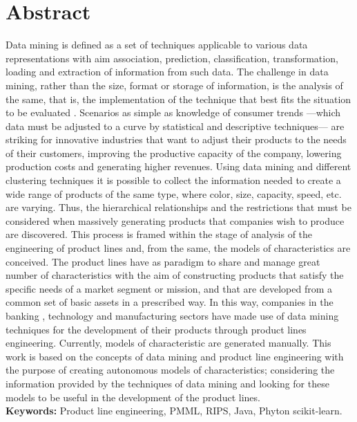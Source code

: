 \chapter{Abstract}

Data mining is defined as a set of techniques applicable to various data representations with aim association, prediction, classification, transformation, loading and extraction of information from such data. The challenge in data mining, rather than the size, format or storage of information, is the analysis of the same, that is, the implementation of the technique that best fits the situation to be evaluated \cite{Izenman2006}. Scenarios as simple as knowledge of consumer trends —which data must be adjusted to a curve by statistical and descriptive techniques— are striking for innovative industries that want to adjust their products to the needs of their customers, improving the productive capacity of the company, lowering production costs and generating higher revenues.
Using data mining and different clustering techniques it is possible to collect the information needed to create a wide range of products of the same type, where color, size, capacity, speed, etc. are varying. Thus, the hierarchical relationships and the restrictions that must be considered when massively generating products that companies wish to produce are discovered. This process is framed within the stage of analysis of the engineering of product lines and, from the same, the models of characteristics are conceived. The product lines have as paradigm to share and manage great number of characteristics with the aim of constructing products that satisfy the specific needs of a market segment or mission, and that are developed from a common set of basic assets in a prescribed way. In this way, companies in the banking \cite{Koutanaei2015}, technology \cite{Lin2013} and manufacturing \cite{Bae2011} sectors have made use of data mining techniques for the development of their products through product lines engineering.
Currently, models of characteristic are generated manually. This work is based on the concepts of data mining and product line engineering with the purpose of creating autonomous models of characteristics; considering the information provided by the techniques of data mining and looking for these models to be useful in the development of the product lines.
\\
\textbf{Keywords:}
Product line engineering, PMML, RIPS, Java, Phyton scikit-learn. 
